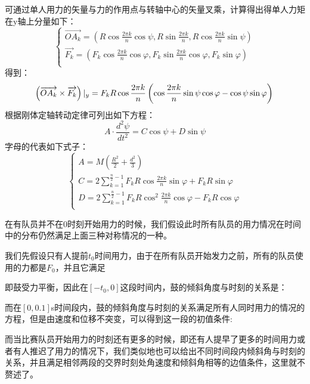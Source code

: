 \documentclass[withoutpreface,bwprint]{cumcmthesis} %
\begin{document}
可通过单人用力的矢量与力的作用点与转轴中心的矢量叉乘，计算得出得单人力矩在y轴上分量如下：
\begin{equation}
\begin{cases}
   \overrightarrow{OA_k}=\left ( R\cos\frac{2\pi k}{n}\cos \psi ,R\sin\frac{2\pi k}{n},R \cos\frac{2\pi k}{n}\sin\psi \right ) \\
   \overrightarrow{F_k}=\left ( F_k\cos\frac{2\pi k}{n}\cos\varphi ,F_k\sin\frac{2\pi k}{n}\cos\varphi ,F_k\sin\varphi  \right ) \\

\end{cases}
\end{equation}
得到：
\begin{equation}
\left ( \overrightarrow{OA_k} \times \overrightarrow{F_k}\right )|_y=F_kR\cos\frac{2\pi k}{n}\left ( \cos\frac{2\pi k}{n}\sin\psi\cos\varphi -\cos\psi\sin\varphi  \right )\\
\end{equation}
根据刚体定轴转动定律可列出如下方程：
\begin{equation}
A\cdot \frac{d^{2}\psi }{dt^{2} }=C\cos\psi+D\sin \psi
\end{equation}
字母的代表如下式子：
\begin{equation}
\begin{cases}
A=M\left ( \frac{R^2}{2}+\frac{d^2}{3} \right ) \\
C=2\sum_{k=1}^{\frac{n}{2}-1}F_kR\cos\frac{2\pi k}{n}\sin\varphi+F_kR\sin\varphi \\
D=2\sum_{k=1}^{\frac{n}{2}-1}F_kR\cos^2\frac{2\pi k}{n}\cos\varphi-F_k R\cos\varphi
\\
\end{cases}
\end{equation}


在有队员并不在0时刻开始用力的时候，我们假设此时所有队员的用力情况在时间中的分布仍然满足上面三种对称情况的一种。\par
我们先假设只有人提前$t_0$时间用力，由于在所有队员开始发力之前，所有的队员使用的力都是$F_0$，并且它满足

即鼓受力平衡，因此在$\left [ -t_0,0 \right ]$这段时间内，鼓的倾斜角度与时刻的关系是：

\par 而在$\left [ 0,0.1 \right ]$s时间段内，鼓的倾斜角度与时刻的关系满足所有人同时用力的情况的方程，但是由速度和位移不突变，可以得到这一段的初值条件:

\par 而当比赛队员开始用力的时刻还有更多的时候，即还有人提早了更多的时间用力或者有人推迟了用力的情况下，我们类似地也可以给出不同时间段内倾斜角与时刻的关系，并且满足相邻两段的交界时刻处角速度和倾斜角相等的边值条件，这里就不赘述了。
\end{document}

